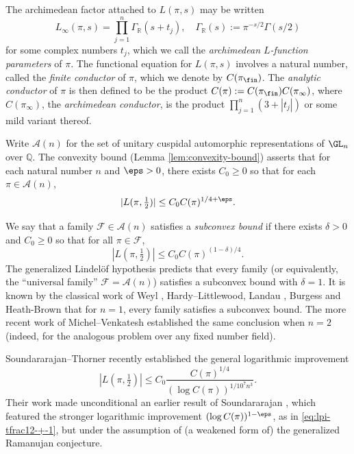 The archimedean factor attached to $L(\pi,s)$ may be written
\begin{equation}\label{eqn:L-infinity}
  L_\infty(\pi,s) =
  \prod_{j=1}^{n}
  \Gamma_\mathbb{R}(s + t_j),
  \quad
  \Gamma_{\mathbb{R}}(s) := \pi^{-s/2} \Gamma(s/2)
\end{equation}
for some complex numbers $t_j$, which we call the \emph{archimedean $L$-function parameters} of $\pi$.  The functional equation for $L(\pi,s)$ involves a natural number, called the \emph{finite conductor} of $\pi$, which we denote by $C(\pi_{\fin})$.  The \emph{analytic conductor} of $\pi$ \cite{MR1826269} is then defined to be the product $C(\pi) := C(\pi_{\fin}) C(\pi_\infty)$, where $C(\pi_\infty)$, the \emph{archimedean conductor}, is the product $\prod_{j=1}^n (3 + |t_j|)$ or some mild variant thereof.

Write $\mathcal{A}(n)$ for the set of unitary cuspidal automorphic representations of $\GL_n$ over $\mathbb{Q}$.  The convexity bound (Lemma \ref{lem:convexity-bound}) asserts that for each natural number $n$ and $\eps > 0$, there exists $C_0 \geq 0$ so that for each $\pi \in \mathcal{A}(n)$,
\begin{equation*}
  |L(\pi,\tfrac{1}{2})| \leq C_0 C(\pi)^{1/4+\eps}.
\end{equation*}

We say that a family $\mathcal{F} \in \mathcal{A}(n)$ satisfies a \emph{subconvex bound} if there exists $\delta > 0$ and $C_0 \geq 0$ so that for all $\pi \in \mathcal{F}$,
\begin{equation*}
  |L(\pi, \tfrac{1}{2} )| \leq C_0 C(\pi)^{(1 - \delta)/4}.
\end{equation*}
The generalized Lindel\"{o}f hypothesis predicts that every family (or equivalently, the ``universal family'' $\mathcal{F} = \mathcal{A}(n)$) satisfies a subconvex bound with $\delta = 1$.  It is known by the classical work of Weyl \cite{MR1511862}, Hardy--Littlewood, Landau \cite{MR1544665}, Burgess \cite{Bur57} and Heath-Brown \cite{MR485727} that for $n = 1$, every family satisfies a subconvex bound.  The more recent work of Michel--Venkatesh \cite{michel-2009} established the same conclusion when $n=2$ (indeed, for the analogous problem over any fixed number field).

Soundararajan--Thorner \cite{MR3953433} recently established the general logarithmic improvement
\begin{equation}\label{eq:lpi-tfrac12-leq-2}
  |L(\pi,\tfrac{1}{2})| \leq C_0 \frac{C(\pi)^{1/4}}{(\log C(\pi))^{1/10^7 n^3}}.
\end{equation}
Their work made unconditional an earlier result of Soundararajan \cite[Thm 1]{MR2680497}, which featured the stronger logarithmic improvement $(\log C(\pi))^{1-\eps}$, as in \eqref{eq:lpi-tfrac12-+-1}, but under the assumption of (a weakened form of) the generalized Ramanujan conjecture.

